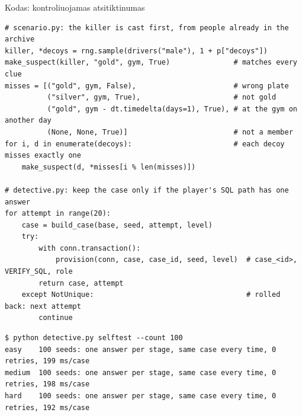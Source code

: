 \documentclass[hyperref={breaklinks=true},fleqn,mathserif]{beamer}
\begin{document}
\begin{frame}[fragile]{Kodas: kontroliuojamas atsitiktinumas}

\vspace{-1mm}
\begin{lstlisting}[basicstyle=\ttfamily\fontsize{6.8}{8}\selectfont]
# scenario.py: the killer is cast first, from people already in the archive
killer, *decoys = rng.sample(drivers("male"), 1 + p["decoys"])
make_suspect(killer, "gold", gym, True)               # matches every clue
misses = [("gold", gym, False),                       # wrong plate
          ("silver", gym, True),                      # not gold
          ("gold", gym - dt.timedelta(days=1), True), # at the gym on another day
          (None, None, True)]                         # not a member
for i, d in enumerate(decoys):                        # each decoy misses exactly one
    make_suspect(d, *misses[i % len(misses)])

# detective.py: keep the case only if the player's SQL path has one answer
for attempt in range(20):
    case = build_case(base, seed, attempt, level)
    try:
        with conn.transaction():
            provision(conn, case, case_id, seed, level)  # case_<id>, VERIFY_SQL, role
        return case, attempt
    except NotUnique:                                    # rolled back: next attempt
        continue
\end{lstlisting}

\vspace{-2mm}
\begin{lstlisting}[style=term]
$ python detective.py selftest --count 100
easy    100 seeds: one answer per stage, same case every time, 0 retries, 199 ms/case
medium  100 seeds: one answer per stage, same case every time, 0 retries, 198 ms/case
hard    100 seeds: one answer per stage, same case every time, 0 retries, 192 ms/case
\end{lstlisting}

\end{frame}
\end{document}
